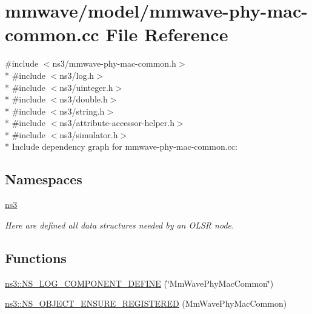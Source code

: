 \hypertarget{mmwave-phy-mac-common_8cc}{}\section{mmwave/model/mmwave-\/phy-\/mac-\/common.cc File Reference}
\label{mmwave-phy-mac-common_8cc}
{\ttfamily \#include $<$ns3/mmwave-\/phy-\/mac-\/common.\+h$>$}\\*
{\ttfamily \#include $<$ns3/log.\+h$>$}\\*
{\ttfamily \#include $<$ns3/uinteger.\+h$>$}\\*
{\ttfamily \#include $<$ns3/double.\+h$>$}\\*
{\ttfamily \#include $<$ns3/string.\+h$>$}\\*
{\ttfamily \#include $<$ns3/attribute-\/accessor-\/helper.\+h$>$}\\*
{\ttfamily \#include $<$ns3/simulator.\+h$>$}\\*
Include dependency graph for mmwave-\/phy-\/mac-\/common.cc\+:
\subsection*{Namespaces}
\begin{DoxyCompactItemize}
\item 
 \hyperlink{namespacens3}{ns3}
\begin{DoxyCompactList}\small\item\em Here are defined all data structures needed by an O\+L\+SR node. \end{DoxyCompactList}\end{DoxyCompactItemize}
\subsection*{Functions}
\begin{DoxyCompactItemize}
\item 
\hyperlink{namespacens3_a19afe40eb4ce922664c1784f5285be92}{ns3\+::\+N\+S\+\_\+\+L\+O\+G\+\_\+\+C\+O\+M\+P\+O\+N\+E\+N\+T\+\_\+\+D\+E\+F\+I\+NE} (\char`\"{}Mm\+Wave\+Phy\+Mac\+Common\char`\"{})
\item 
\hyperlink{namespacens3_abfb8858ab9c7512c433a32e6092678ac}{ns3\+::\+N\+S\+\_\+\+O\+B\+J\+E\+C\+T\+\_\+\+E\+N\+S\+U\+R\+E\+\_\+\+R\+E\+G\+I\+S\+T\+E\+R\+ED} (Mm\+Wave\+Phy\+Mac\+Common)
\end{DoxyCompactItemize}
